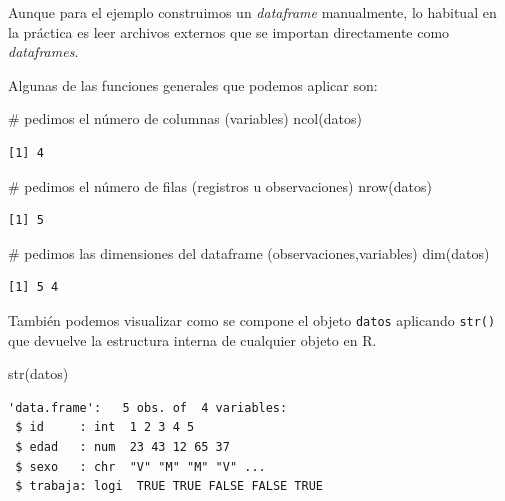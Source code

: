 \documentclass[
  spanish,
  a4paper,
]{scrbook}
\newenvironment{Shaded}{\begin{snugshade}}{\end{snugshade}}
\newcommand{\CommentTok}[1]{\textcolor[rgb]{0.37,0.37,0.37}{#1}}
\newcommand{\FunctionTok}[1]{\textcolor[rgb]{0.28,0.35,0.67}{#1}}
\newcommand{\NormalTok}[1]{\textcolor[rgb]{0.00,0.23,0.31}{#1}}
\begin{document}
Aunque para el ejemplo construimos un \emph{dataframe} manualmente, lo
habitual en la práctica es leer archivos externos que se importan
directamente como \emph{dataframes}.

Algunas de las funciones generales que podemos aplicar son:

\begin{Shaded}
\begin{Highlighting}[]
\CommentTok{\# pedimos el número de columnas (variables)}
\FunctionTok{ncol}\NormalTok{(datos)}
\end{Highlighting}
\end{Shaded}

\begin{verbatim}
[1] 4
\end{verbatim}

\begin{Shaded}
\begin{Highlighting}[]
\CommentTok{\# pedimos el número de filas (registros u observaciones)}
\FunctionTok{nrow}\NormalTok{(datos)}
\end{Highlighting}
\end{Shaded}

\begin{verbatim}
[1] 5
\end{verbatim}

\begin{Shaded}
\begin{Highlighting}[]
\CommentTok{\# pedimos las dimensiones del dataframe (observaciones,variables)}
\FunctionTok{dim}\NormalTok{(datos)}
\end{Highlighting}
\end{Shaded}

\begin{verbatim}
[1] 5 4
\end{verbatim}

También podemos visualizar como se compone el objeto \texttt{datos}
aplicando \texttt{str()} que devuelve la estructura interna de cualquier
objeto en R.

\begin{Shaded}
\begin{Highlighting}[]
\FunctionTok{str}\NormalTok{(datos)}
\end{Highlighting}
\end{Shaded}

\begin{verbatim}
'data.frame':   5 obs. of  4 variables:
 $ id     : int  1 2 3 4 5
 $ edad   : num  23 43 12 65 37
 $ sexo   : chr  "V" "M" "M" "V" ...
 $ trabaja: logi  TRUE TRUE FALSE FALSE TRUE
\end{verbatim}
\end{document}
